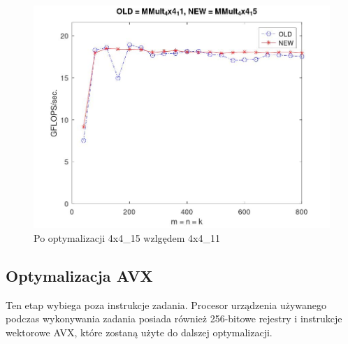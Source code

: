 \documentclass{article}
\begin{document}
\begin{figure}[H]
    \centering
    \includegraphics[width=1.0\textwidth]{figure9.jpg}
    \caption{Po optymalizacji 4x4\_15 wzlgędem 4x4\_11}
\end{figure}

\subsection{Optymalizacja AVX}

Ten etap wybiega poza instrukcje zadania. Procesor urządzenia używanego podczas wykonywania zadania
posiada również 256-bitowe rejestry i instrukcje wektorowe AVX, które zostaną użyte do dalszej 
optymalizacji.
\end{document}
